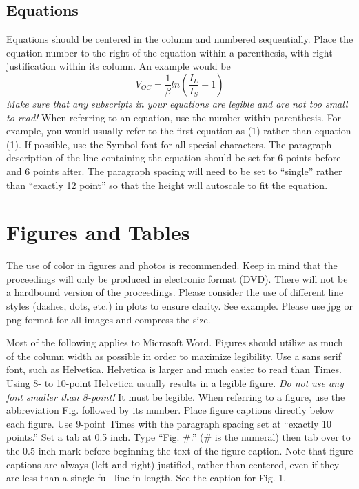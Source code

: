 \documentclass[conference]{./pvsctran}
\begin{document}
\subsection{ Equations }
Equations should be centered in the column and numbered sequentially. Place the equation number to the right of the equation within a parenthesis, with right justification within its column. An example would be
\begin{equation}
V_{OC}=\frac{1}{\beta}ln\left(\frac{I_L}{I_S}+1\right)
\end{equation}
\emph{Make sure that any subscripts in your equations are legible and are not too
small to read!} When referring to an equation, use the number within
parenthesis. For example, you would usually refer to the first
equation as (1) rather than equation (1). If possible, use the Symbol
font for all special characters.%
The paragraph description of the line containing the
equation should be set for 6 points before and 6 points after. The
paragraph spacing will need to be set to ``single'' rather than ``exactly
12 point'' so that the height will autoscale to fit the equation.

\section{Figures and Tables}
The use of color in figures and photos is recommended.  Keep in mind that the proceedings will only be produced in electronic format (DVD).  There will not be a hardbound version of the proceedings.  Please consider the use of different line styles (dashes, dots, etc.) in plots to ensure clarity.  See example.  Please use jpg or png format for all images and compress the size.

Most of the following applies to Microsoft Word.  Figures should utilize as much of the column width as possible in order to maximize legibility. Use a sans serif font, such as Helvetica. Helvetica is larger and much easier to read than Times. Using 8- to 10-point Helvetica usually results in a legible figure. \emph{Do not use any font smaller than 8-point!} It must be legible. When referring to a figure, use the abbreviation Fig. followed by its number. Place figure captions directly below each figure. Use
9-point Times with the paragraph spacing set at ``exactly 10 points.'' Set a tab at 0.5 inch. Type ``Fig. \#.'' (\# is the numeral) then tab over to the 0.5 inch mark before beginning the text of the figure caption. Note that figure captions are always (left and right) justified, rather than centered, even if they are less than a single full line in length. See the caption for Fig. 1.
\end{document}
